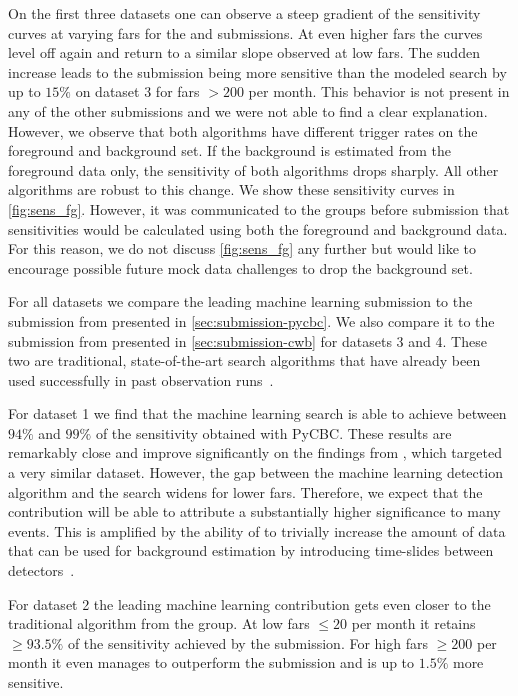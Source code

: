 On the first three datasets one can observe a steep gradient of the sensitivity curves at varying \acrshort{far}s for the \mfcnn and \cnn submissions. At even higher \acrshort{far}s the curves level off again and return to a similar slope observed at low \acrshort{far}s. The sudden increase leads to the \mfcnn submission being more sensitive than the modeled \pycbc search by up to $15\%$ on dataset 3 for \acrshort{far}s $> 200$ per month. This behavior is not present in any of the other submissions and we were not able to find a clear explanation. However, we observe that both algorithms have different trigger rates on the foreground and background set. If the background is estimated from the foreground data only, the sensitivity of both algorithms drops sharply. All other algorithms are robust to this change. We show these sensitivity curves in \autoref{fig:sens_fg}. However, it was communicated to the groups before submission that sensitivities would be calculated using both the foreground and background data. For this reason, we do not discuss \autoref{fig:sens_fg} any further but would like to encourage possible future mock data challenges to drop the background set.

For all datasets we compare the leading machine learning submission to the submission from \pycbc presented in \autoref{sec:submission-pycbc}. We also compare it to the submission from \cwb presented in \autoref{sec:submission-cwb} for datasets 3 and 4. These two are traditional, state-of-the-art search algorithms that have already been used successfully in past observation runs~\cite{LIGOScientific:2016fbo, LIGOScientific:2016aoc, LIGOScientific:2021djp}.

For dataset 1 we find that the machine learning search is able to achieve between $94\%$ and $99\%$ of the sensitivity obtained with PyCBC. These results are remarkably close and improve significantly on the findings from \cite{Schafer:2021cml}, which targeted a very similar dataset. However, the gap between the machine learning detection algorithm and the \pycbc search widens for lower \acrshort{far}s. Therefore, we expect that the \pycbc contribution will be able to attribute a substantially higher significance to many events. This is amplified by the ability of \pycbc to trivially increase the amount of data that can be used for background estimation by introducing time-slides between detectors~\cite{Usman:2015kfa, Schafer:2021cml}.

For dataset 2 the leading machine learning contribution gets even closer to the traditional algorithm from the \pycbc group. At low \acrshort{far}s $\leq 20$ per month it retains $\geq 93.5\%$ of the sensitivity achieved by the \pycbc submission. For high \acrshort{far}s $\geq 200$ per month it even manages to outperform the \pycbc submission and is up to $1.5\%$ more sensitive.


